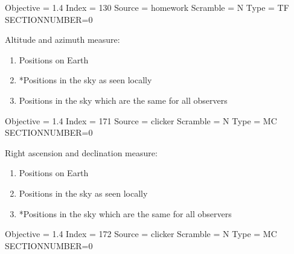 \documentclass[11pt]{article}
\begin{document}
\begin{enumerate}
\begin{minipage}{\textwidth}
\begin{minipage}{\textwidth}
Objective = 1.4
Index = 130
Source = homework
Scramble = N
Type = TF
SECTIONNUMBER=0
\end{minipage}
\end{minipage}
\vskip 0.20in

\begin{minipage}{\textwidth}
\begin{minipage}{\textwidth}
\item Altitude and azimuth measure:
\begin{enumerate} 
\setlength{\itemsep}{1pt} 
\setlength{\parskip}{0pt} 
\setlength{\parsep}{0pt}
\setlength{\multicolsep}{1pt} 
\item Positions on Earth
\item *Positions in the sky as seen locally
\item Positions in the sky which are the same for all observers
\end{enumerate} 
Objective = 1.4
Index = 171
Source = clicker
Scramble = N
Type = MC
SECTIONNUMBER=0
\end{minipage}
\end{minipage}
\vskip 0.20in

\begin{minipage}{\textwidth}
\begin{minipage}{\textwidth}
\item Right ascension and declination measure:
\begin{enumerate} 
\setlength{\itemsep}{1pt} 
\setlength{\parskip}{0pt} 
\setlength{\parsep}{0pt}
\setlength{\multicolsep}{1pt} 
\item Positions on Earth
\item Positions in the sky as seen locally
\item *Positions in the sky which are the same for all observers
\end{enumerate} 
Objective = 1.4
Index = 172
Source = clicker
Scramble = N
Type = MC
SECTIONNUMBER=0
\end{minipage}
\end{minipage}
\vskip 0.20in


\end{enumerate}
\end{document}
